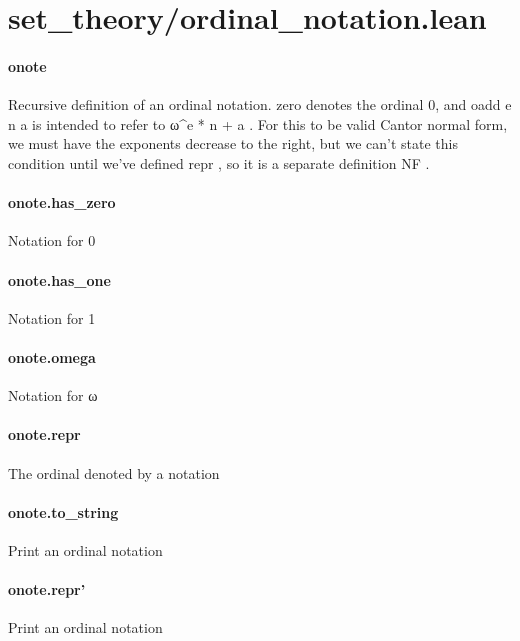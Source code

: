 \documentclass{article}
\begin{document}
\section{set\_theory/ordinal\_notation.lean}\paragraph{onote}
\par
Recursive definition of an ordinal notation. 
\colorbox[RGB]{253,246,227}{{{{\color[RGB]{101, 123, 131} zero }}}} denotes the
ordinal 0, and 
\colorbox[RGB]{253,246,227}{{{{\color[RGB]{101, 123, 131} oadd e n a }}}} is intended to refer to 
\colorbox[RGB]{253,246,227}{{{{\color[RGB]{101, 123, 131} ω\textasciicircum{}e  }}}{{{\color[RGB]{181, 137, 0} * }}}{{{\color[RGB]{101, 123, 131}  n  }}}{{{\color[RGB]{181, 137, 0} + }}}{{{\color[RGB]{101, 123, 131}  a }}}}.
For this to be valid Cantor normal form, we must have the exponents
decrease to the right, but we can't state this condition until we've
defined 
\colorbox[RGB]{253,246,227}{{{{\color[RGB]{101, 123, 131} repr }}}}, so it is a separate definition 
\colorbox[RGB]{253,246,227}{{{{\color[RGB]{101, 123, 131} NF }}}}.
\paragraph{onote.has\_zero}
\par
Notation for 0
\paragraph{onote.has\_one}
\par
Notation for 1
\paragraph{onote.omega}
\par
Notation for ω
\paragraph{onote.repr}
\par
The ordinal denoted by a notation
\paragraph{onote.to\_string}
\par
Print an ordinal notation
\paragraph{onote.repr'}
\par
Print an ordinal notation
\end{document}
